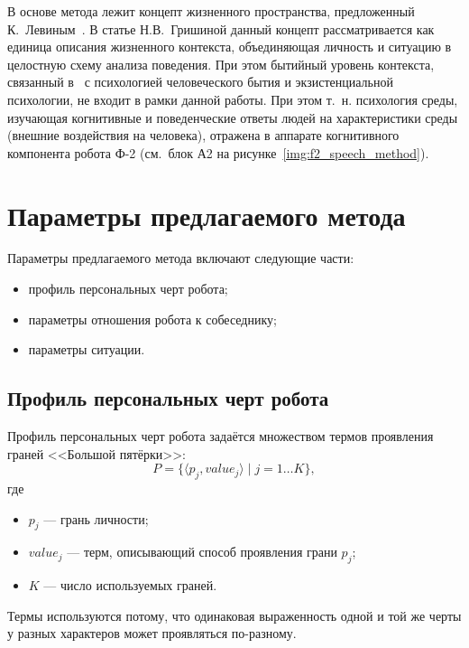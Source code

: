 В основе метода лежит концепт жизненного пространства, предложенный К.~Левиным~\cite{grishina2018context}.
В статье Н.В.~Гришиной данный концепт рассматривается как единица описания жизненного контекста, объединяющая личность и ситуацию в целостную схему анализа поведения. При этом бытийный уровень контекста, связанный в~\cite{grishina2018context} с психологией человеческого бытия и экзистенциальной психологии, не входит в рамки данной работы. При этом т.~н. психология среды, изучающая когнитивные и поведенческие ответы людей
на характеристики среды (внешние воздействия на человека), отражена в аппарате когнитивного компонента робота Ф-2 (см.~блок А2 на рисунке~\ref{img:f2_speech_method}).

\section{Параметры предлагаемого метода}

Параметры предлагаемого метода включают следующие части:

\begin{itemize}
	\item профиль персональных черт робота;
	\item параметры отношения робота к собеседнику;
	\item параметры ситуации.
\end{itemize}

\subsection*{Профиль персональных черт робота}

Профиль персональных черт робота задаётся множеством термов проявления граней <<Большой пятёрки>>:
\begin{equation}
	\label{eq:personality_profile}
	P = \{\langle p_j, value_j \rangle \mid j = 1 \dots K\},
\end{equation}
где

\begin{itemize}
	\item \(p_j\) --- грань личности;
	\item \(value_j\) --- терм, описывающий способ проявления грани \(p_j\);
	\item \(K\) --- число используемых граней.
\end{itemize}

Термы используются потому, что одинаковая выраженность одной и той же черты у разных характеров может проявляться по-разному.

